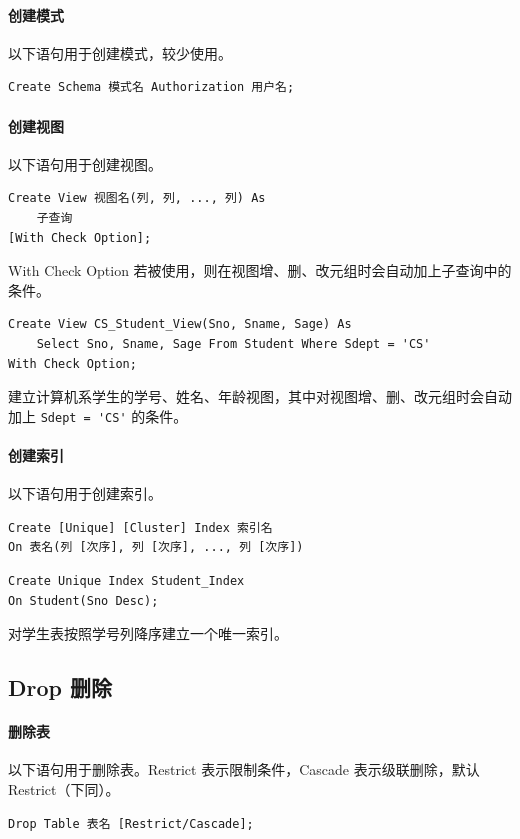 \documentclass[UTF8]{ctexart}
\begin{document}
\paragraph{创建模式}
以下语句用于创建模式，较少使用。
\begin{lstlisting}
Create Schema 模式名 Authorization 用户名;
\end{lstlisting}


\paragraph{创建视图}
以下语句用于创建视图。
\begin{lstlisting}
Create View 视图名(列, 列, ..., 列) As
    子查询
[With Check Option];
\end{lstlisting}
With Check Option 若被使用，则在视图增、删、改元组时会自动加上子查询中的条件。

\begin{lstlisting}[backgroundcolor=\color{white}]
Create View CS_Student_View(Sno, Sname, Sage) As
    Select Sno, Sname, Sage From Student Where Sdept = 'CS'
With Check Option;
\end{lstlisting}
建立计算机系学生的学号、姓名、年龄视图，其中对视图增、删、改元组时会自动加上 \verb!Sdept = 'CS'! 的条件。

\paragraph{创建索引}
以下语句用于创建索引。
\begin{lstlisting}
Create [Unique] [Cluster] Index 索引名
On 表名(列 [次序], 列 [次序], ..., 列 [次序])
\end{lstlisting}

\begin{lstlisting}[backgroundcolor=\color{white}]
Create Unique Index Student_Index
On Student(Sno Desc);
\end{lstlisting}
对学生表按照学号列降序建立一个唯一索引。


\subsection{Drop 删除}
\paragraph{删除表} 以下语句用于删除表。Restrict 表示限制条件，Cascade 表示级联删除，默认 Restrict（下同）。
\begin{lstlisting}
Drop Table 表名 [Restrict/Cascade];
\end{lstlisting}
\end{document}
